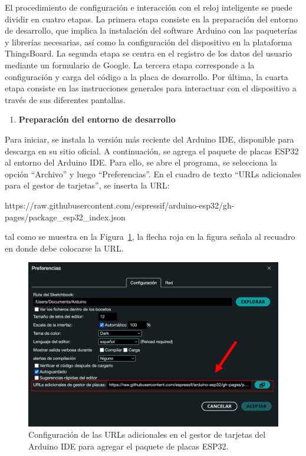 \documentclass[
  12pt,
  letterpaper,
  DIV=11,
  numbers=noendperiod]{scrreport}
\newenvironment{Shaded}{\begin{snugshade}}{\end{snugshade}}
\newcommand{\ExtensionTok}[1]{\textcolor[rgb]{0.00,0.23,0.31}{#1}}
\providecommand{\tightlist}{%
  \setlength{\itemsep}{0pt}\setlength{\parskip}{0pt}}\usepackage{longtable,booktabs,array}
\begin{document}
El procedimiento de configuración e interacción con el reloj inteligente
se puede dividir en cuatro etapas. La primera etapa consiste en la
preparación del entorno de desarrollo, que implica la instalación del
software Arduino con las paqueterías y librerías necesarias, así como la
configuración del dispositivo en la plataforma ThingsBoard. La segunda
etapa se centra en el registro de los datos del usuario mediante un
formulario de Google. La tercera etapa corresponde a la configuración y
carga del código a la placa de desarrollo. Por última, la cuarta etapa
consiste en las instrucciones generales para interactuar con el
dispositivo a través de sus diferentes pantallas.

\begin{enumerate}
\def\labelenumi{\arabic{enumi}.}
\tightlist
\item
  \textbf{Preparación del entorno de desarrollo}
\end{enumerate}

Para iniciar, se instala la versión más reciente del Arduino IDE,
disponible para descarga en su sitio oficial. A continuación, se agrega
el paquete de placas ESP32 al entorno del Arduino IDE. Para ello, se
abre el programa, se selecciona la opción ``Archivo'' y luego
``Preferencias''. En el cuadro de texto ``URLs adicionales para el
gestor de tarjetas'', se inserta la URL:

\begin{Shaded}
\begin{Highlighting}[]
\ExtensionTok{https://raw.githubusercontent.com/espressif/arduino{-}esp32/gh{-}pages/package\_esp32\_index.json}
\end{Highlighting}
\end{Shaded}

tal como se muestra en la Figura~\ref{fig-paqueteriaArduino}, la flecha
roja en la figura señala al recuadro en donde debe colocarse la URL.

\begin{figure}

{\centering \includegraphics{Capitulos/../Imagenes/Paqueteria_arduino.png}

}

\caption{\label{fig-paqueteriaArduino}Configuración de las URLs
adicionales en el gestor de tarjetas del Arduino IDE para agregar el
paquete de placas ESP32.}

\end{figure}
\end{document}
